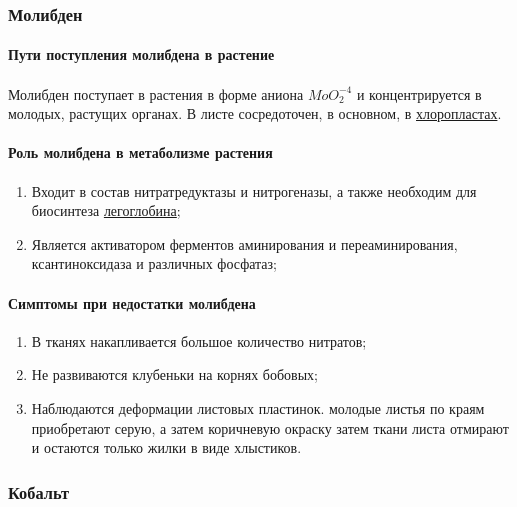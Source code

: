\subsubsection*{Молибден} 

\paragraph*{Пути поступления молибдена в растение}

\paragraph*{}Молибден поступает в растения в форме аниона $MoO_{2}^{-4}$ и концентрируется в молодых, растущих органах. В листе сосредоточен, в основном, в \hyperlink{cell_plastids}{хлоропластах}.

\paragraph*{Роль молибдена в метаболизме растения}

\begin{enumerate}
	\item Входит в состав нитратредуктазы и нитрогеназы, а также необходим для биосинтеза \hyperlink{leggemoglobin}{легоглобина};
	\item Является активатором ферментов аминирования и переаминирования, ксантиноксидаза и различных фосфатаз;
\end{enumerate}

\paragraph*{Симптомы при недостатки молибдена}

\begin{enumerate}
	\item В тканях накапливается большое количество нитратов;
	\item Не развиваются клубеньки на корнях бобовых;
	\item Наблюдаются деформации листовых пластинок. молодые листья по краям приобретают серую, а затем коричневую окраску затем ткани листа отмирают и остаются только жилки в виде хлыстиков.
\end{enumerate}

\subsubsection*{Кобальт} 

